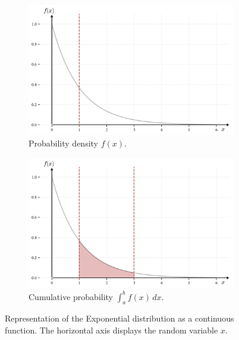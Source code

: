 \documentclass{book}
\begin{document}
\begin{figure}[ht]
    \centering
    \begin{subfigure}[b]{0.48\textwidth}
        \centering
        \includegraphics[width=\textwidth, height=0.7\textwidth]{figures/chapter2/exponential_1.png}
        \caption{Probability density $f(x)$.}
        \label{fig:exponential1}
    \end{subfigure}
    \hfill
    \begin{subfigure}[b]{0.48\textwidth}
        \centering
        \includegraphics[width=\textwidth, height=0.7\textwidth]{figures/chapter2/exponential_2.png}
        \caption{Cumulative probability $\int_a^b f(x) \, dx$.}
        \label{fig:exponential2}
    \end{subfigure}
    \caption{Representation of the Exponential distribution as a continuous function. The horizontal axis displays the random variable $x$.}
    \label{fig:exponential_comparison}
\end{figure}
\end{document}
